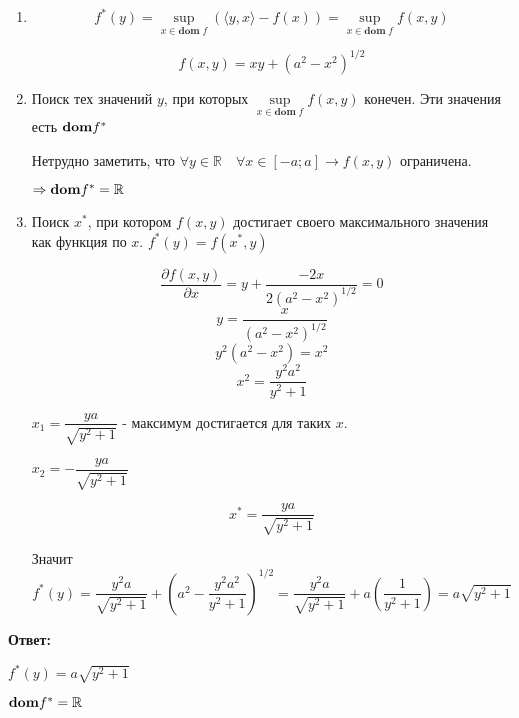 \documentclass[a4paper,12pt]{article}
\newcommand{\lt}{\left}
\newcommand{\rt}{\right}
\newcommand{\p}{\partial}
\newcommand{\fr}{\frac}
\newcommand{\dfr}{\dfrac}
\newcommand{\bb}{\mathbb}
\begin{document}
\begin{enumerate}
	\item $$f^*(y) = \sup\limits_{x \in \mathbf{dom} \; f} \left( \langle y,x\rangle - f(x)\right)  = \sup\limits_{x \in \mathbf{dom} \; f} f(x,y)$$
	
	$$f(x, y) = xy + (a^2 - x^2)^{1/2}$$
	
	\item  Поиск тех значений $y$, при которых $ \sup\limits_{x \in \mathbf{dom} \; f} f(x,y)$ конечен. Эти значения есть ${\bf dom}f^*$
	
	Нетрудно заметить, что $\forall y\in \bb R \quad \forall x \in [-a;a] \rightarrow f(x,y) $ ограничена.
	
	$\Rightarrow {\bf dom}f^* = \bb R$

	\item Поиск $x^*$, при котором $f(x,y)$ достигает своего максимального значения как функция по $x$. $f^*(y) = f(x^*, y)$
	
	$$\fr{\p f(x, y)}{\p x} = y + \fr{-2x}{2(a^2 -x^2)^{1/2}} = 0$$
	$$y = \fr{x}{(a^2 -x^2)^{1/2}}$$
	$$y^2(a^2 -x^2) = x^2$$
	$$x^2 = \fr{y^2a^2}{y^2+1}$$
	
	$x_1 = \dfr{ya}{\sqrt{y^2+1}}$ - максимум достигается для таких $x$.
	
	$x_2 = -\dfr{ya}{\sqrt{y^2+1}}$
	
	$$x^* = \dfr{ya}{\sqrt{y^2+1}}$$
	
	Значит $$f^*(y) = \fr{y^2a}{\sqrt{y^2+1}} + \lt(a^2 - \fr{y^2a^2}{y^2+1}\rt)^{1/2} = \fr{y^2a}{\sqrt{y^2+1}} + a\lt(\fr{1}{y^2+1} \rt) = a\sqrt{y^2 + 1}$$
	
\end{enumerate}
\textbf{Ответ:}

$f^*(y) = a\sqrt{y^2 + 1}$

${\bf dom}f^* = \bb R$
\end{document}
